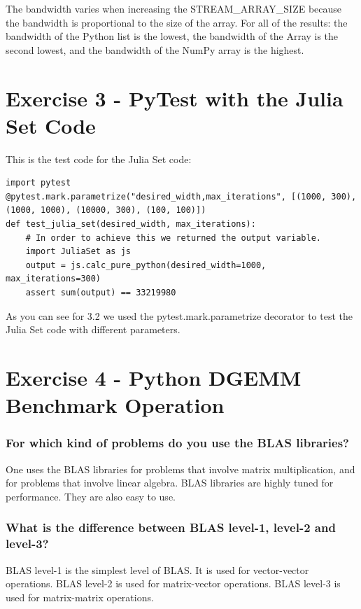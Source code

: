\documentclass{article}
\begin{document}
The bandwidth varies when increasing the STREAM_ARRAY_SIZE because the bandwidth is proportional to the size of the array.
For all of the results: the bandwidth of the Python list is the lowest, the bandwidth of the Array is the second lowest, and the bandwidth of the NumPy array is the highest.

\section{Exercise 3 - PyTest with the Julia Set Code}

This is the test code for the Julia Set code:
\begin{lstlisting}
import pytest
@pytest.mark.parametrize("desired_width,max_iterations", [(1000, 300), (1000, 1000), (10000, 300), (100, 100)])
def test_julia_set(desired_width, max_iterations):
    # In order to achieve this we returned the output variable.
    import JuliaSet as js
    output = js.calc_pure_python(desired_width=1000, max_iterations=300)
    assert sum(output) == 33219980
\end{lstlisting}
As you can see for 3.2 we used the pytest.mark.parametrize decorator to test the Julia Set code with different parameters.


\section{Exercise 4 - Python DGEMM Benchmark Operation}

\subsubsection{For which kind of problems do you use the BLAS libraries?}

One uses the BLAS libraries for problems that involve matrix multiplication, and for problems that involve linear algebra.
BLAS libraries are highly tuned for performance. 
They are also easy to use.

\subsubsection{What is the difference between BLAS level-1, level-2 and level-3?}

BLAS level-1 is the simplest level of BLAS.
It is used for vector-vector operations.
BLAS level-2 is used for matrix-vector operations.
BLAS level-3 is used for matrix-matrix operations.
\end{document}
